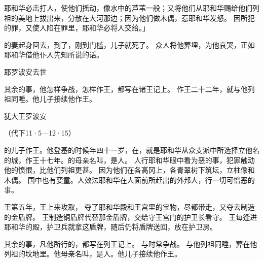 {耶和华必击打{}人，使他们摇动，像水中的芦苇一般；又将他们从耶和华赐给他们列祖的美地上拔出来，分散在大河那边；因为他们做木偶，惹耶和华发怒。
因{}所犯的罪，又使{}人陷在罪里，耶和华必将{}人交给{}。」
\par }{\PP {}的妻起身回去，到了{}，刚到门槛，儿子就死了。
众人将他葬埋，为他哀哭，正如耶和华借他仆人先知{}所说的话。
\par }{\SH 耶罗波安去世
\par }{\PP {}其余的事，他怎样争战，怎样作王，都写在{}诸王记上。
作王二十二年，就与他列祖同睡。他儿子{}接续他作王。
\par }{\SH 犹大王罗波安
\par }{\R （代下11·5—12·15）
\par }{\PP {}的儿子{}作{}王。他登基的时候年四十一岁，在{}，就是耶和华从{}众支派中所选择立他名的城，作王十七年。{}的母亲名叫{}，是{}人。
人行耶和华眼中看为恶的事，犯罪触动他的愤恨，比他们列祖更甚。
因为他们在各高冈上，各青翠树下筑坛，立柱像和木偶。
国中也有娈童。{}人效法耶和华在{}人面前所赶出的外邦人，行一切可憎恶的事。
\par }{\PP {}王第五年，{}王{}上来攻取{}，
夺了耶和华殿和王宫里的宝物，尽都带走，又夺去{}制造的金盾牌。
王制造铜盾牌代替那金盾牌，交给守王宫门的护卫长看守。
王每逢进耶和华的殿，护卫兵就拿这盾牌，随后仍将盾牌送回，放在护卫房。
\par }{\PP {}其余的事，凡他所行的，都写在{}列王记上。
与{}时常争战。
与他列祖同睡，葬在{}他列祖的坟地里。他母亲名叫{}，是{}人。他儿子{}接续他作王。

}
